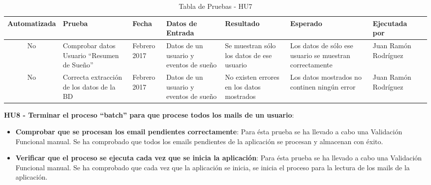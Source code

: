 \documentclass[11pt,openany]{book}
\begin{document}
{\tiny
\setlength{\LTleft}{-20cm plus -1fill}
\setlength{\LTright}{\LTleft}
\begin{center}
\begin{longtable}{| c | M{1.5cm} | M{1.5cm} | M{2.5cm} | M{1.5cm} | M{1.5cm} | M{1.5cm} | M{1.5cm} |}
\caption[Tabla de Pruebas - HU7]{Tabla de Pruebas - HU7} \label{grid_mlmmh} \\

\hline Automatizada & Prueba & Fecha & Datos de Entrada & Resultado & Esperado & Ejecutada por \\
\endfirsthead
\hline
No & Comprobar datos Usuario ``Resumen de Sueño'' & Febrero 2017 & Datos de un usuario y eventos de sueño & Se muestran sólo los datos de ese usuario & Los datos de sólo ese usuario se muestran correctamente & Juan Ramón Rodríguez \\
\hline
No & Correcta extracción de los datos de la BD & Febrero 2017 & Datos de un usuario y eventos de sueño & No existen errores en los datos mostrados & Los datos mostrados no continen ningún error & Juan Ramón Rodríguez \\
\hline
\end{longtable}
\end{center}}
 
\textbf{HU8 - Terminar el proceso ``batch'' para que procese todos los mails de un usuario}:

\begin{itemize}
\item\textbf{Comprobar que se procesan los email pendientes correctamente}: Para ésta prueba se ha llevado a cabo una Validación Funcional manual. Se ha comprobado que todos los emails pendientes de la aplicación se procesan y almacenan con éxito.
\item\textbf{Verificar que el proceso se ejecuta cada vez que se inicia la aplicación}: Para ésta prueba se ha llevado a cabo una Validación Funcional manual. Se ha comprobado que cada vez que la aplicación se inicia, se inicia el proceso para la lectura de los mails de la aplicación.
\end{itemize}
\end{document}
